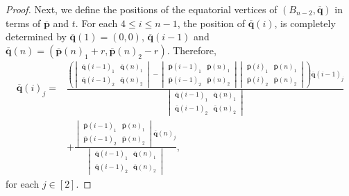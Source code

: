 \documentclass[10pt,a4paper]{amsart}
\begin{document}
\begin{proof}
    Next, we define the positions of the equatorial vertices of $(B_{n-2},\overline{\mathbf{q}})$ in terms of $\overline{\mathbf{p}}$ and $t$.
    For each $4\leq i\leq n-1$, the position of $\overline{\mathbf{q}}(i)$, is completely determined by $\overline{\mathbf{q}}(1)=(0,0)$, $\overline{\mathbf{q}}(i-1)$ and $\overline{\mathbf{q}}(n)=(\overline{\mathbf{p}}(n)_1+r,\overline{\mathbf{p}}(n)_2-r)$.
    Therefore,
    \begin{equation}\label{eq:bip3}
    \begin{split}
        \overline{\mathbf{q}}(i)_j=&\frac{\left(\begin{vmatrix} \overline{\mathbf{q}}(i-1)_1 & \overline{\mathbf{q}}(n)_1 \\ \overline{\mathbf{q}}(i-1)_2 & \overline{\mathbf{q}}(n)_2 \end{vmatrix} - \begin{vmatrix} \overline{\mathbf{p}}(i-1)_1 & \overline{\mathbf{p}}(n)_1 \\ \overline{\mathbf{p}}(i-1)_2 & \overline{\mathbf{p}}(n)_2 \end{vmatrix} \begin{vmatrix} \overline{\mathbf{p}}(i)_1 & \overline{\mathbf{p}}(n)_1 \\ \overline{\mathbf{p}}(i)_2 & \overline{\mathbf{p}}(n)_2 \end{vmatrix} \right)\overline{\mathbf{q}}(i-1)_j}{\begin{vmatrix} \overline{\mathbf{q}}(i-1)_1 & \overline{\mathbf{q}}(n)_1 \\ \overline{\mathbf{q}}(i-1)_2 & \overline{\mathbf{q}}(n)_2 \end{vmatrix}} \\
        &+ \frac{\begin{vmatrix} \overline{\mathbf{p}}(i-1)_1 & \overline{\mathbf{p}}(n)_1 \\ \overline{\mathbf{p}}(i-1)_2 & \overline{\mathbf{p}}(n)_2 \end{vmatrix}\overline{\mathbf{q}}(n)_j}{\begin{vmatrix} \overline{\mathbf{q}}(i-1)_1 & \overline{\mathbf{q}}(n)_1 \\ \overline{\mathbf{q}}(i-1)_2 & \overline{\mathbf{q}}(n)_2 \end{vmatrix}},
    \end{split}
    \end{equation}
    for each $j\in[2]$.


\end{proof}
\end{document}
